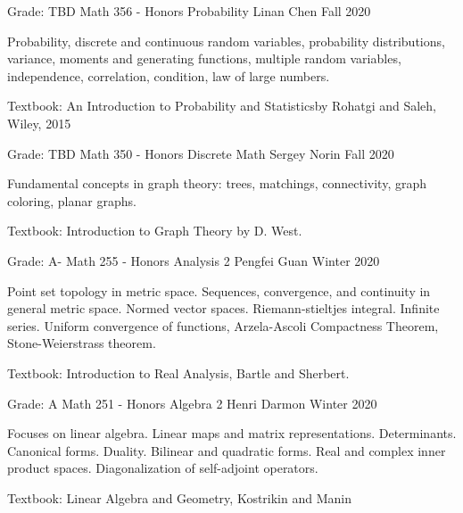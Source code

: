 
\begin{cventries}
    \cventry
    {Grade: TBD} %
    {Math 356 - Honors Probability} %
    {Linan Chen} %
    {Fall 2020} %
    {
      \begin{cvitems} %
      \item {Probability, discrete and continuous random variables, probability distributions, variance, moments and generating functions, multiple random variables, independence, correlation, condition, law of large numbers.}
      \item {Textbook: An Introduction to Probability and Statisticsby Rohatgi and Saleh, Wiley, 2015}
      \end{cvitems}
    }

    \cventry
    {Grade: TBD} %
    {Math 350 - Honors Discrete Math} %
    {Sergey Norin} %
    {Fall 2020} %
    {
      \begin{cvitems} %
      \item {Fundamental concepts in graph theory: trees, matchings, connectivity, graph coloring, planar graphs.}
      \item {Textbook: Introduction to Graph Theory by D. West.}
      \end{cvitems}
    }


    \cventry
    {Grade: A-} %
    {Math 255 - Honors Analysis 2} %
    {Pengfei Guan} %
    {Winter 2020} %
    {
      \begin{cvitems} %
      \item {Point set topology in metric space. Sequences, convergence, and continuity in general metric space. Normed vector spaces. Riemann-stieltjes integral. Infinite series. Uniform convergence of functions, Arzela-Ascoli Compactness Theorem, Stone-Weierstrass theorem.}
      \item {Textbook: Introduction to Real Analysis, Bartle and Sherbert.}
      \end{cvitems}
    }

    \cventry
    {Grade: A} %
    {Math 251 - Honors Algebra 2} %
    {Henri Darmon} %
    {Winter 2020} %
    {
      \begin{cvitems} %
      \item {Focuses on linear algebra. Linear maps and matrix representations. Determinants. Canonical forms. Duality. Bilinear and quadratic forms. Real and complex inner product spaces. Diagonalization of self-adjoint operators.}
      \item {Textbook: Linear Algebra and Geometry, Kostrikin and Manin}
      \end{cvitems}
    }



\end{cventries}
